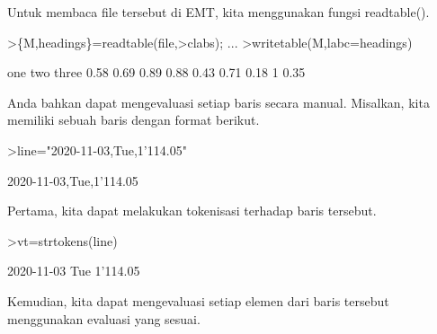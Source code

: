 \documentclass[12pt,arial,letterpaper]{book}
\begin{document}
\begin{eulercomment}
\begin{eulercomment}
\begin{eulercomment}
\begin{eulercomment}
\begin{eulercomment}
\begin{eulercomment}
\begin{eulercomment}
\begin{eulercomment}
\begin{eulercomment}
\begin{eulercomment}
\begin{eulercomment}
\begin{eulercomment}
\begin{eulercomment}
\begin{eulercomment}
\begin{eulercomment}
\begin{eulercomment}
\begin{eulercomment}
\begin{eulercomment}
\begin{eulercomment}
\begin{eulercomment}
\begin{eulercomment}
\begin{eulercomment}
\begin{eulercomment}
\begin{eulercomment}
\begin{eulercomment}
\begin{eulercomment}
\begin{eulercomment}
\begin{eulercomment}
\begin{eulercomment}
\begin{eulercomment}
\begin{eulercomment}
\begin{eulercomment}
\begin{eulercomment}
\begin{eulercomment}
\begin{eulercomment}
\begin{eulercomment}
\begin{eulercomment}
\begin{eulercomment}
\begin{eulercomment}
Untuk membaca file tersebut di EMT, kita menggunakan fungsi
readtable().
\end{eulercomment}
\begin{eulerprompt}
>\{M,headings\}=readtable(file,>clabs); ...
>writetable(M,labc=headings)
\end{eulerprompt}
\begin{euleroutput}
         one       two     three
        0.58      0.69      0.89
        0.88      0.43      0.71
        0.18         1      0.35
\end{euleroutput}
\begin{eulercomment}
Anda bahkan dapat mengevaluasi setiap baris secara manual. Misalkan,
kita memiliki sebuah baris dengan format berikut.
\end{eulercomment}
\begin{eulerprompt}
>line="2020-11-03,Tue,1'114.05"
\end{eulerprompt}
\begin{euleroutput}
  2020-11-03,Tue,1'114.05
\end{euleroutput}
\begin{eulercomment}
Pertama, kita dapat melakukan tokenisasi terhadap baris tersebut.
\end{eulercomment}
\begin{eulerprompt}
>vt=strtokens(line)
\end{eulerprompt}
\begin{euleroutput}
  2020-11-03
  Tue
  1'114.05
\end{euleroutput}
\begin{eulercomment}
Kemudian, kita dapat mengevaluasi setiap elemen dari baris tersebut
menggunakan evaluasi yang sesuai.
\end{eulercomment}

\end{eulercomment}
\end{eulercomment}
\end{eulercomment}
\end{eulercomment}
\end{eulercomment}
\end{eulercomment}
\end{eulercomment}
\end{eulercomment}
\end{eulercomment}
\end{eulercomment}
\end{eulercomment}
\end{eulercomment}
\end{eulercomment}
\end{eulercomment}
\end{eulercomment}
\end{eulercomment}
\end{eulercomment}
\end{eulercomment}
\end{eulercomment}
\end{eulercomment}
\end{eulercomment}
\end{eulercomment}
\end{eulercomment}
\end{eulercomment}
\end{eulercomment}
\end{eulercomment}
\end{eulercomment}
\end{eulercomment}
\end{eulercomment}
\end{eulercomment}
\end{eulercomment}
\end{eulercomment}
\end{eulercomment}
\end{eulercomment}
\end{eulercomment}
\end{eulercomment}
\end{eulercomment}
\end{eulercomment}
\end{document}
